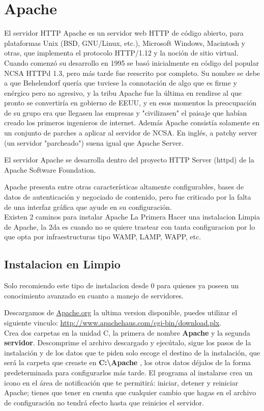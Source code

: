 \section{Apache}

El servidor HTTP Apache es un servidor web HTTP de código abierto, para plataformas
Unix (BSD, GNU/Linux, etc.), Microsoft Windows, Macintosh y otras, que implementa
el protocolo HTTP/1.12 y la noción de sitio virtual. Cuando comenzó su desarrollo en 1995 se basó inicialmente
en código del popular NCSA HTTPd 1.3, pero más tarde fue reescrito por completo. Su nombre se
debe a que Behelendorf quería que tuviese la connotación de algo que es firme
y enérgico pero no agresivo, y la tribu Apache fue la última en rendirse al que pronto se
convertiría en gobierno de EEUU, y en esos momentos la preocupación de su grupo era que
llegasen las empresas y "civilizasen" el paisaje que habían creado los primeros ingenieros de internet.
Además Apache consistía solamente en un conjunto de parches a aplicar al servidor de NCSA.
En inglés, a patchy server (un servidor "parcheado") suena igual que Apache Server. 

El servidor Apache se desarrolla dentro del proyecto HTTP Server (httpd) de la
Apache Software Foundation.

Apache presenta entre otras características altamente configurables, bases de
datos de autenticación y negociado de contenido, pero fue criticado por la falta
de una interfaz gráfica que ayude en su configuración.\\[0.2cm]

Existen 2 caminos para instalar Apache La Primera Hacer una instalacion Limpia
de Apache, la 2da es cuando no se quiere trastear con tanta configuracion por lo que
opta por infraestructuras tipo WAMP, LAMP, WAPP, etc.

\subsection{Instalacion en Limpio}

Solo recomiendo este tipo de instalacion desde 0 para quienes ya poseen un conocimiento
avanzado en cuanto a manejo de servidores.

Descargamos de \url{Apache.org} la ultima version disponible, puedes utilizar el siguiente
vinculo: \url{http://www.apachehaus.com/cgi-bin/download.plx}. \\ 
Crea dos carpetas en la unidad C, la primera de nombre {\bfseries Apache} y la segunda
{\bfseries servidor}. Descomprime el archivo descargado y ejecútalo,
sigue los pasos de la instalación y de los datos que te piden solo escoge el
destino de la instalación, que será la carpeta que creaste en
{\bfseries C:\textbackslash Apache }, los otros datos déjalos de la forma
predeterminada para configurarlos más tarde.
El programa al instalarse crea un icono en el área de notificación que te
permitirá: iniciar, detener y reiniciar Apache; tienes que tener en cuenta que
cualquier cambio que hagas en el archivo de configuración no tendrá efecto
hasta que reinicies el servidor.

